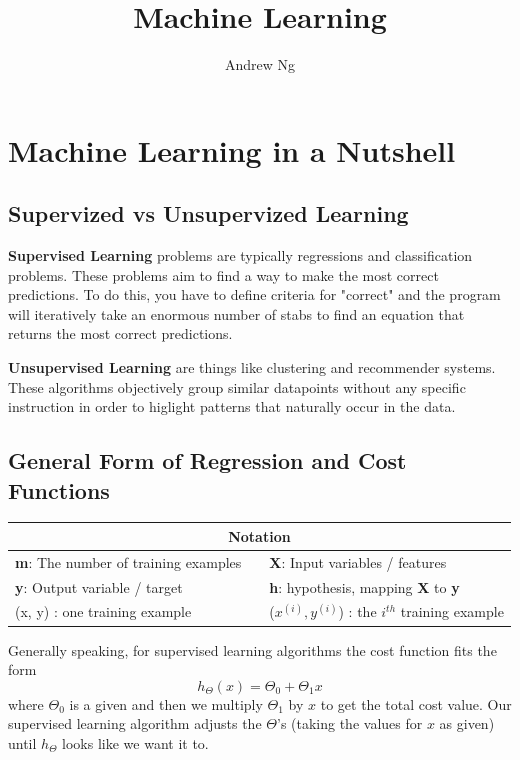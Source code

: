 \documentclass[twoside, 11pt-]{article}
\title{\bf{Machine Learning}}
\author{Andrew Ng}
\date{}
\begin{document}
\maketitle \thispagestyle{empty}
\tableofcontents \newpage


\section{Machine Learning in a Nutshell}


\subsection{Supervized vs Unsupervized Learning}

\textbf{Supervised Learning} problems are typically regressions and classification problems. These problems aim to find a way to make the most correct predictions. To do this, you have to define criteria for "correct" and the program will iteratively take an enormous number of stabs to find an equation that returns the most correct predictions.

\textbf{Unsupervised Learning} are things like clustering and recommender systems. These algorithms objectively group similar datapoints without any specific instruction in order to higlight patterns that naturally occur in the data.

\subsection{General Form of Regression and Cost Functions}

\begin{center}
	\begin{tabular}{l c l}
		\multicolumn{3}{c}{Notation}\\\hline
		\textbf{m}: The number of training examples & & \textbf{X}: Input variables / features \\
		\textbf{y}: Output variable / target & & \textbf{h}: hypothesis, mapping \textbf{X} to \textbf{y} \\
		(x, y) : one training example & & ($x^{(i)}, y^{(i)}$) : the $i^{th}$ training example
	\end{tabular}
\end{center}


Generally speaking, for supervised learning algorithms the cost function fits the form
\[ h_\Theta (x) = \Theta_0 + \Theta_1 x\]
where $\Theta_0$ is a given and then we multiply $\Theta_1$ by $x$ to get the total cost value. Our supervised learning algorithm adjusts the $\Theta$'s (taking the values for $x$ as given) until $h_\Theta$ looks like we want it to.
\end{document}
